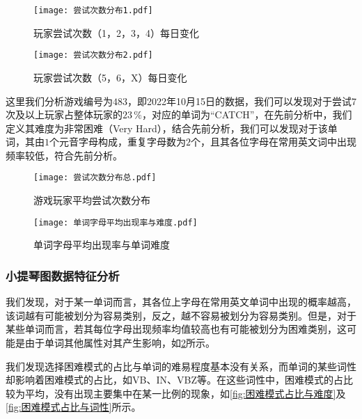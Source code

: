 \documentclass{MathModeling}
\begin{document}
	\begin{figure}[H]
		\centering
		\begin{minipage}{0.48\linewidth}
			\centering
			\texttt{[image: 尝试次数分布1.pdf]}
			\caption{玩家尝试次数（1，2，3，4）每日变化}
			\label{fig:尝试次数分布1}
		\end{minipage}
		\begin{minipage}{0.48\linewidth}
			\centering
			\texttt{[image: 尝试次数分布2.pdf]}
			\caption{玩家尝试次数（5，6，X）每日变化}
			\label{fig:尝试次数分布2}
		\end{minipage}
	\end{figure}

	这里我们分析游戏编号为$483$，即2022年10月15日的数据，我们可以发现对于尝试7次及以上玩家占整体玩家的$23\,\%$，对应的单词为“CATCH”，在先前分析中，我们定义其难度为非常困难（Very Hard），结合先前分析，我们可以发现对于该单词，其由$1$个元音字母构成，重复字母数为$2$个，且其各位字母在常用英文词中出现频率较低，符合先前分析。

	\begin{figure}[H]
		\centering
		\begin{minipage}{0.48\linewidth}
			\centering
			\texttt{[image: 尝试次数分布总.pdf]}
			\caption{游戏玩家平均尝试次数分布}
			\label{fig:尝试次数分布总}
		\end{minipage}
		\begin{minipage}{0.48\linewidth}
			\centering
			\texttt{[image: 单词字母平均出现率与难度.pdf]}
			\caption{单词字母平均出现率与单词难度}
			\label{fig:单词字母平均出现率与单词难度}
		\end{minipage}
	\end{figure}

	\subsubsection{小提琴图数据特征分析}
	我们发现，对于某一单词而言，其各位上字母在常用英文单词中出现的概率越高，该词越有可能被划分为容易类别，反之，越不容易被划分为容易类别。但是，对于某些单词而言，若其每位字母出现频率均值较高也有可能被划分为困难类别，这可能是由于单词其他属性对其产生影响，如\textcolor{blue}{\cref{fig:单词字母平均出现率与单词难度}}所示。

	我们发现选择困难模式的占比与单词的难易程度基本没有关系，而单词的某些词性却影响着困难模式的占比，如VB、IN、VBZ等。在这些词性中，困难模式的占比较为平均，没有出现主要集中在某一比例的现象，如\textcolor{blue}{\cref{fig:困难模式占比与难度}}及\textcolor{blue}{\cref{fig:困难模式占比与词性}}所示。
\end{document}
